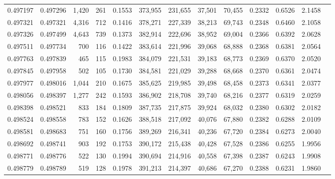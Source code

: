 \begin{tabular}{rrrrrrrrrrrrr}
0.497197 & 0.497296 & 1,420 &   261 &                                     0.1553 & 373,955 & 231,655 &  37,501 &  70,455 & 0.2332 & 0.6526 & 2.1458 \\
0.497321 & 0.497321 & 4,316 &   712 &                                     0.1416 & 378,271 & 227,339 &  38,213 &  69,743 & 0.2348 & 0.6460 & 2.1058 \\
0.497326 & 0.497499 & 4,643 &   739 &                                     0.1373 & 382,914 & 222,696 &  38,952 &  69,004 & 0.2366 & 0.6392 & 2.0628 \\
0.497511 & 0.497734 &   700 &   116 &                                     0.1422 & 383,614 & 221,996 &  39,068 &  68,888 & 0.2368 & 0.6381 & 2.0564 \\
0.497763 & 0.497839 &   465 &   115 &                                     0.1983 & 384,079 & 221,531 &  39,183 &  68,773 & 0.2369 & 0.6370 & 2.0520 \\
0.497845 & 0.497958 &   502 &   105 &                                     0.1730 & 384,581 & 221,029 &  39,288 &  68,668 & 0.2370 & 0.6361 & 2.0474 \\
0.497977 & 0.498016 & 1,044 &   210 &                                     0.1675 & 385,625 & 219,985 &  39,498 &  68,458 & 0.2373 & 0.6341 & 2.0377 \\
0.498056 & 0.498397 & 1,277 &   242 &                                     0.1593 & 386,902 & 218,708 &  39,740 &  68,216 & 0.2377 & 0.6319 & 2.0259 \\
0.498398 & 0.498521 &   833 &   184 &                                     0.1809 & 387,735 & 217,875 &  39,924 &  68,032 & 0.2380 & 0.6302 & 2.0182 \\
0.498524 & 0.498558 &   783 &   152 &                                     0.1626 & 388,518 & 217,092 &  40,076 &  67,880 & 0.2382 & 0.6288 & 2.0109 \\
0.498581 & 0.498683 &   751 &   160 &                                     0.1756 & 389,269 & 216,341 &  40,236 &  67,720 & 0.2384 & 0.6273 & 2.0040 \\
0.498692 & 0.498741 &   903 &   192 &                                     0.1753 & 390,172 & 215,438 &  40,428 &  67,528 & 0.2386 & 0.6255 & 1.9956 \\
0.498771 & 0.498776 &   522 &   130 &                                     0.1994 & 390,694 & 214,916 &  40,558 &  67,398 & 0.2387 & 0.6243 & 1.9908 \\
0.498779 & 0.498789 &   519 &   128 &                                     0.1978 & 391,213 & 214,397 &  40,686 &  67,270 & 0.2388 & 0.6231 & 1.9860 \\

\end{tabular}
